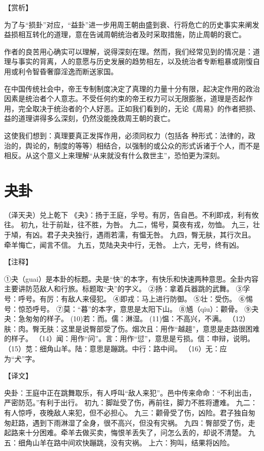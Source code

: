 \documentclass[a4paper,12pt,UTF8,twoside]{ctexbook}
\begin{document}
【赏析】

为了与“损卦”对应，“益卦”进一步用周王朝由盛到衰、行将危亡的历史事实来阐发益损相互转化的道理，意在告诫周朝统治者及时采取措施，防止周朝的衰亡。

作者的良苦用心确实可以理解，说得深刻在理。然而，我们经常见到的情况是：道理与事实的背离，人的意愿与历史发展的趋势相左，以及统治者专断粗暴或刚愎自用或利令智昏奢靡淫逸而断送家国。

在中国传统社会中，帝王专制制度决定了真理的力量十分有限，起决定作用的政治因素是统治者个人意志。不受任何约束的帝王权力可以无限膨胀，道理是否起作用，完全取决于统治者的个人好恶。正如我们看到的，无论《周易》的作者把损、益的道理讲得多么深刻，仍然没能挽救周王朝的衰亡。

这使我们想到：真理要真正发挥作用，必须同权力（包括各 种形式：法律的，政治的，舆论的，制度的等等）相结合，以强制的或公众的形式诉诸于个人，而不是相反。从这个意义上来理解“从来就没有什么救世主”，恐怕更为深刻。

\chapter{夬卦}

（泽天夬）兑上乾下
《夬》：扬于王庭，孚号。有厉，告自邑。不利即戎，利有攸往。
初九，壮于前趾，往不胜，为咎。
九二，惕号，莫夜有戎，勿恤。
九三，壮于頄，有凶。君子夬夬独行，遇雨若濡，有愠无咎。
九四，臀无肤，其行次且。牵羊悔亡，闻言不信。
九五，苋陆夬夬中行，无咎。
上六，无号，终有凶。

【注释】

①夬（guai）是本卦的标题。夬是“快”的本字，有快乐和快速两种意思。全卦内容主要讲防范敌人和行旅。标题取“夬”的字义。
②扬：拿着兵器跳的武舞。
③孚号：呼号。有厉：有敌人来侵犯。
④即戎：马上进行防御。
⑤壮：受伤。
⑥惕号：惊恐呼号。
⑦莫：“暮”的本字，意思是太阳下山。
⑧馗（qiu）：颧骨。
⑨夬夬：急匆匆的样子。
(10)若：而。儒：淋湿。
(11)愠：不高兴，不满。
（12）肤：肉。臀无肤：这里是说臀部受了伤。烟次且：用作“越趄”，意思是走路很困难的样子。
（14）闻：用作“问”。言：用作“愆”，意思是亏损。信：申辩，说明。
（15）苋：细角山羊。陆：意思是蹦跳。中行：路中间。
（16）无：应为“犬”字。

【译文】

央卦：王庭中正在跳舞取乐，有人呼叫“敌人来犯”。邑中传来命命：“不利出击，严密防范。”有利于出行。
初九：脚趾受了伤，再前往，脚力不胜将遭难。
九二：有人惊呼，夜晚敌人来犯，但不必担心。
九三：颧骨受了伤，凶险。君子独自匆匆赶路，遇到下雨淋湿了全身，很不高兴，但没有灾祸。
九四：臀部受了伤，走起路来十分困难。牵羊去做买卖，悔恨羊丢失了，问怎么丢的，却说不清楚。
九五：细角山羊在路中间欢快蹦跳，没有灾祸。
上六：狗叫，结果将凶险。
\end{document}
